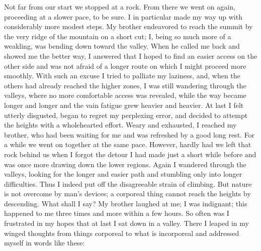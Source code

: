 Not far from our start we stopped at a rock. From there we
went on again, proceeding at a slower pace, to be sure. I in
particular made my way up with considerably more modest steps. My
brother endeavored to reach the summit by the very ridge of the
mountain on a short cut; I, being so much more of a weakling, was
bending down toward the valley. When he called me back and showed me
the better way, I answered that I hoped to find an easier access on
the other side and was not afraid of a longer route on which I might
proceed more smoothly. With such an excuse I tried to palliate my
laziness, and, when the others had already reached the higher zones, I
was still wandering through the valleys, where no more comfortable
access was revealed, while the way became longer and longer and the
vain fatigue grew heavier and heavier. At last I felt utterly
disgusted, began to regret my perplexing error, and decided to attempt
the heights with a wholehearted effort. Weary and exhausted, I reached
my brother, who had been waiting for me and was refreshed by a good
long rest. For a while we went on together at the same pace. However,
hardly had we left that rock behind us when I forgot the detour I had
made just a short while before and was once more drawing down the
lower regions. Again I wandered through the valleys, looking for the
longer and easier path and stumbling only into longer difficulties.
Thus I indeed put off the disagreeable strain of climbing. But nature
is not overcome by man's devices; a corporeal thing cannot reach the
heights by descending. What shall I say? My brother laughed at me; I
was indignant; this happened to me three times and more within a few
hours. So often was I frustrated in my hopes that at last I sat down
in a valley. There I leaped in my winged thoughts from things
corporeal to what is incorporeal and addressed myself in words like
these:


